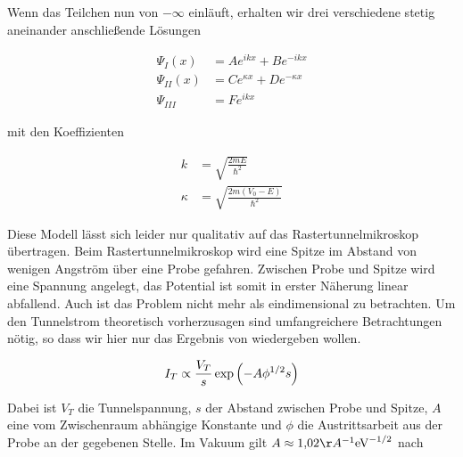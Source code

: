 \documentclass[a4paper,german,12pt,smallheadings]{scrartcl}
\begin{document}
Wenn das Teilchen nun von $-\infty$ einläuft, erhalten wir drei verschiedene
stetig aneinander anschließende Lösungen

\begin{align*}
  \Psi_{I}(x) &= A e^{ikx} + B e^{-ikx} \\
  \Psi_{II}(x) &= C e^{\kappa x} + D e^{-\kappa x} \\
  \Psi_{III} &= F e^{ikx}
\end{align*}

mit den Koeffizienten

\begin{align*}
  k &= \sqrt{\frac{2mE}{\hbar^2}} \\
  \kappa &= \sqrt{\frac{2m (V_0 - E)}{\hbar^2}}
\end{align*}

Diese Modell lässt sich leider nur qualitativ auf das Rastertunnelmikroskop
übertragen. Beim Rastertunnelmikroskop wird eine Spitze im Abstand von wenigen
Angström über eine Probe gefahren. Zwischen Probe und Spitze wird eine Spannung
angelegt, das Potential ist somit in erster Näherung linear abfallend. Auch ist
das Problem nicht mehr als eindimensional zu betrachten. Um den Tunnelstrom
theoretisch vorherzusagen sind umfangreichere Betrachtungen nötig, so dass wir
hier nur das Ergebnis von \citep{hpa1982} wiedergeben wollen.

\begin{equation}
  I_{T} \propto \frac{V_T}{s} \exp \del{-A \phi^{1/2} s}
\end{equation}

Dabei ist $V_T$ die Tunnelspannung, $s$ der Abstand zwischen Probe und Spitze,
$A$ eine vom Zwischenraum abhängige Konstante und $\phi$ die Austrittsarbeit
aus der Probe an der gegebenen Stelle. Im Vakuum gilt
$A \approx 1{,}02 \AA^{-1} \text{eV}^{-1/2}$ nach \citep{versuchsanleitung}


\end{document}
